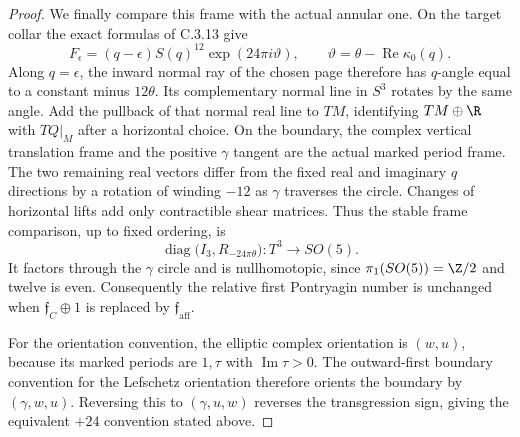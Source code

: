 \begin{proof}
We finally compare this frame with the actual annular one.
On the target collar the exact formulas of C.3.13 give
\[
 F_\epsilon=(q-\epsilon)S(q)^{12}
              \exp(24\pi i\vartheta),
 \qquad\vartheta=\theta-\operatorname{Re}\kappa_0(q).
\]
Along $q=\epsilon$, the inward normal ray of the chosen page
therefore has $q$-angle equal to a constant minus $12\theta$.
Its complementary normal line in $S^3$ rotates by the same
angle. Add the pullback of that normal real line to $TM$,
identifying $TM\oplus\R$ with $TQ|_M$ after a horizontal
choice. On the boundary, the complex vertical translation
frame and the positive $\gamma$ tangent are the actual marked
period frame. The two remaining real vectors differ from
the fixed real and imaginary $q$ directions by a rotation
of winding $-12$ as $\gamma$ traverses the circle. Changes
of horizontal lifts add only contractible shear matrices.
Thus the stable frame comparison, up to fixed ordering, is
\[
 \operatorname{diag}\bigl(I_3,R_{-24\pi\theta}\bigr):
 T^3\longrightarrow SO(5).
\]
It factors through the $\gamma$ circle and is nullhomotopic,
since $\pi_1(SO(5))=\Z/2$ and twelve is even. Consequently
the relative first Pontryagin number is unchanged when
$\mathfrak f_C\oplus1$ is replaced by
$\mathfrak f_{\mathrm{aff}}$.

For the orientation convention, the elliptic complex orientation
is $(w,u)$, because its marked periods are $1,\tau$ with
$\operatorname{Im}\tau>0$. The outward-first boundary convention
for the Lefschetz orientation therefore orients the boundary
by $(\gamma,w,u)$. Reversing this to $(\gamma,u,w)$ reverses
the transgression sign, giving the equivalent $+24$ convention
stated above.
\end{proof}

